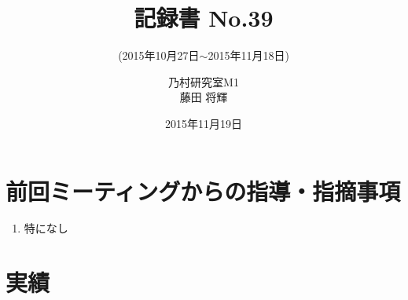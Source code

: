 \documentclass[fleqn, 14pt]{extarticle}
\subtitle{(2015年10月27日$\sim$2015年11月18日)}
\author{乃村研究室M1\\藤田 将輝}
\date{2015年11月19日}
\title{記録書 No.39}
\begin{document}
    \maketitle

    \section{前回ミーティングからの指導・指摘事項}
    \label{sec-1}
    \begin{enumerate}
        \item 特になし
    \end{enumerate}

    \section{実績}
    \label{sec-2}
\end{document}
